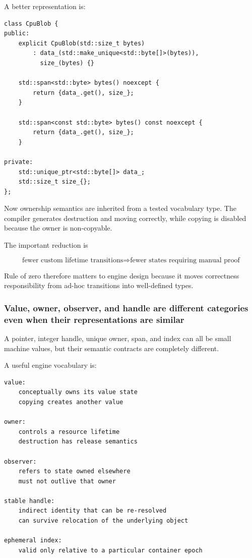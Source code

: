 A better representation is:

\begin{verbatim}
class CpuBlob {
public:
    explicit CpuBlob(std::size_t bytes)
        : data_(std::make_unique<std::byte[]>(bytes)),
          size_(bytes) {}

    std::span<std::byte> bytes() noexcept {
        return {data_.get(), size_};
    }

    std::span<const std::byte> bytes() const noexcept {
        return {data_.get(), size_};
    }

private:
    std::unique_ptr<std::byte[]> data_;
    std::size_t size_{};
};
\end{verbatim}

Now ownership semantics are inherited from a tested vocabulary type. The compiler generates destruction and moving correctly, while copying is disabled because the owner is non-copyable.

The important reduction is

\[
\boxed{
\text{fewer custom lifetime transitions}
\Rightarrow
\text{fewer states requiring manual proof}
}
\]

Rule of zero therefore matters to engine design because it moves correctness responsibility from ad-hoc transitions into well-defined types.

\subsubsection{Value, owner, observer, and handle are different categories even when their representations are similar}\label{01-foundations-i-ch005-value-owner-observer-and-handle-are-different-categories-even-when-their-representations-are-similar}

\hypertarget{01-foundations-i-ch005-value-owner-observer-and-handle-are-different-categories-even-when-their-representations-are-similar}{}

A pointer, integer handle, unique owner, span, and index can all be small machine values, but their semantic contracts are completely different.

A useful engine vocabulary is:

\begin{verbatim}
value:
    conceptually owns its value state
    copying creates another value

owner:
    controls a resource lifetime
    destruction has release semantics

observer:
    refers to state owned elsewhere
    must not outlive that owner

stable handle:
    indirect identity that can be re-resolved
    can survive relocation of the underlying object

ephemeral index:
    valid only relative to a particular container epoch
\end{verbatim}

